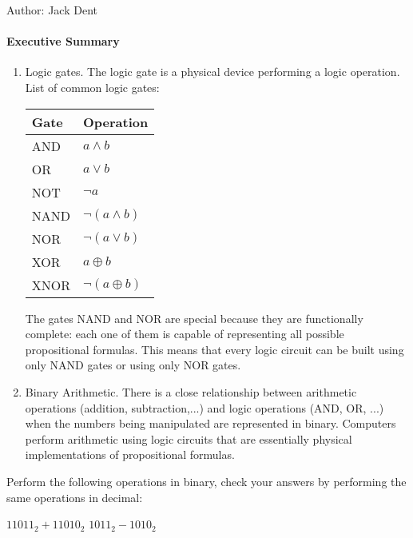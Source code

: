 \documentclass[solution, letterpaper]{cs20inclass}
\begin{document}

\noindent Author: Jack Dent%

\paragraph*{Executive Summary}
\begin{enumerate}

\item Logic gates. The logic gate is a physical device performing a logic operation. List of common logic gates:
\begin{table}[h]

\centering
\begin{tabular}{| l | l |}
\hline
Gate & Operation \\ \hline
AND & $a \land b$ \\ \hline
OR & $a \lor b$ \\ \hline
NOT & $\lnot a$ \\ \hline
NAND & $\lnot(a \land b)$ \\ \hline
NOR & $\lnot(a \lor b)$ \\ \hline
XOR & $a \oplus b$ \\ \hline
XNOR & $\lnot (a \oplus b)$ \\ \hline
\end{tabular}
\end{table}

The gates NAND and NOR are special because they are functionally complete: each one of them is capable of representing all possible propositional formulas. This means that every logic circuit can be built using only NAND gates or using only NOR gates. 

\item Binary Arithmetic. There is a close relationship between arithmetic operations (addition, subtraction,...) and logic operations (AND, OR, ...) when the numbers being manipulated are represented in binary. Computers perform arithmetic using logic circuits that are essentially physical implementations of propositional formulas.  

\end{enumerate}
\pagebreak

\problem
Perform the following operations in binary, check your answers by performing the same operations in decimal:

\subproblem $11011_2 + 11010_2$
\subproblem $1011_2 - 1010_2$
\end{document}
